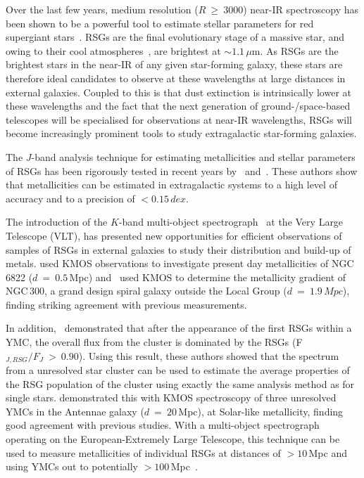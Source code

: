 \documentclass[useAMS,usenatbib]{mn2e}
\begin{document}
Over the last few years, medium resolution ($R~\geq~3000$) near-IR spectroscopy has been shown to be a powerful tool to estimate stellar parameters for red supergiant stars~\citep[RSGs;][]{2010MNRAS.407.1203D}.
RSGs are the final evolutionary stage of a massive star, and owing to their cool atmospheres~\citep[T$_{eff}\sim4000$;][]{2013ApJ...767....3D}, are brightest at $\sim1.1\,\mu$m.
As RSGs are the brightest stars in the near-IR of any given star-forming galaxy, these stars are therefore ideal candidates to observe at these wavelengths at large distances in external galaxies.
Coupled to this is that dust extinction is intrinsically lower at these wavelengths and the fact that the next generation of ground-/space-based telescopes will be specialised for observations at near-IR wavelengths, RSGs will become increasingly prominent tools to study extragalactic star-forming galaxies.

The $J$-band analysis technique for estimating metallicities and stellar parameters of RSGs has been rigorously tested in recent years by~\cite{2014ApJ...788...58G} and~\cite{2015ApJ...806...21D}.
These authors show that metallicities can be estimated in extragalactic systems to a high level of accuracy and to a precision of $<0.15\,dex$.

The introduction of the $K$-band multi-object spectrograph~\citep[KMOS;][]{2013Msngr.151...21S} at the Very Large Telescope (VLT), has presented new opportunities for efficient observations of samples of RSGs in external galaxies to study their distribution and build-up of metals.
\cite{2015ApJ...803...14P} used KMOS observations to investigate present day metallicities of NGC\,6822 ($d~=~0.5\,$Mpc) and~\cite{2015ApJ...805..182G} used KMOS to determine the metallicity gradient of NGC\,300, a grand design spiral galaxy outside the Local Group ($d~=~1.9\,Mpc$), finding striking agreement with previous measurements.

In addition,~\citet{2013MNRAS.430L..35G} demonstrated that after the appearance of the first RSGs within a YMC, the overall flux from the cluster is dominated by the RSGs (F$_{J, RSG}/F_{J}~>~0.90$).
Using this result, these authors showed that the spectrum from a unresolved star cluster can be used to estimate the average properties of the RSG population of the cluster using exactly the same analysis method as for single stars.
\citet{2015ApJ...812..160L} demonstrated this with KMOS spectroscopy of three unresolved YMCs in the Antennae galaxy ($d~=~20\,$Mpc), at Solar-like metallicity, finding good agreement with previous studies.
With a multi-object spectrograph operating on the European-Extremely Large Telescope, this technique can be used to measure metallicities of individual RSGs at distances of $>10\,$Mpc and using YMCs out to potentially $>100\,$Mpc~\citep{2011A&A...527A..50E}.
\end{document}
